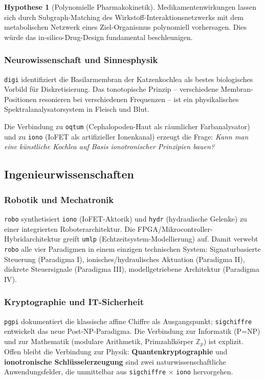 ﻿\documentclass[a4paper,12pt]{scrreprt}
\theoremstyle{definition}
\newtheorem{hypothese}{Hypothese}[section]
\begin{document}
\begin{hypothese}[Polynomielle Pharmakokinetik]
  Medikamentenwirkungen lassen sich durch Subgraph-Matching des
  Wirkstoff-Interaktionsnetzwerks mit dem metabolischen Netzwerk eines
  Ziel-Organismus polynomiell vorhersagen. Dies würde das
  in-silico-Drug-Design fundamental beschleunigen.
\end{hypothese}

\subsubsection{Neurowissenschaft und Sinnesphysik}

\texttt{digi} identifiziert die Basilarmembran der Katzenkochlea als
bestes biologisches Vorbild für Diskretisierung. Das tonotopische Prinzip
-- verschiedene Membran-Positionen resonieren bei verschiedenen Frequenzen --
ist ein physikalisches Spektralanalysatorsystem in Fleisch und Blut.

Die Verbindung zu \texttt{oqtum} (Cephalopoden-Haut als räumlicher
Farbana\-lysator) und zu \texttt{iono} (IoFET als artifizieller Ionenkanal)
erzeugt die Frage: \emph{Kann man eine künstliche Kochlea auf Basis
ionotronischer Prinzipien bauen?}

\subsection{Ingenieurwissenschaften}

\subsubsection{Robotik und Mechatronik}

\texttt{robo} synthetisiert \texttt{iono} (IoFET-Aktorik) und
\texttt{hydr} (hydraulische Gelenke) zu einer integrierten Roboterarchitektur.
Die FPGA/Mikrocontroller-Hybridarchitektur greift \texttt{umlp}
(Echtzeitsystem-Modellierung) auf. Damit verwebt \texttt{robo} alle
vier Paradigmen in einem einzigen technischen System:
Signaturbasierte Steuerung (Paradigma I),
ionisches/hydraulisches Aktuation (Paradigma II),
diskrete Steuersignale (Paradigma III),
modellgetriebene Architektur (Paradigma IV).

\subsubsection{Kryptographie und IT-Sicherheit}

\texttt{pgpi} dokumentiert die klassische affine Chiffre als Ausgangspunkt;
\texttt{sigchiffre} entwickelt das neue Post-NP-Paradigma. Die Verbindung
zur Informatik (P=NP) und zur Mathematik (modulare Arithmetik, Primzahlkörper
$\mathbb{Z}_p$) ist explizit. Offen bleibt die Verbindung zur Physik:
\textbf{Quantenkryptographie} und \textbf{ionotronische Schlüsselerzeugung}
sind zwei naturwissenschaftliche Anwendungsfelder, die unmittelbar aus
\texttt{sigchiffre} $\times$ \texttt{iono} hervorgehen.
\end{document}
